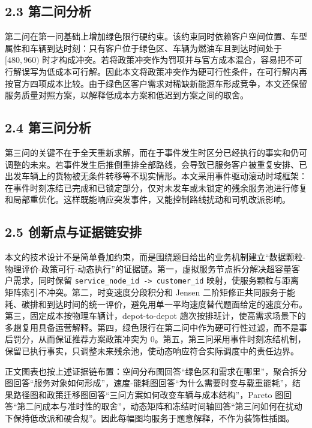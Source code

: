 \documentclass[UTF8,zihao=-4,a4paper]{ctexart}
\begin{document}
\subsection{2.3 第二问分析}

第二问在第一问基础上增加绿色限行硬约束。该约束同时依赖客户空间位置、车型属性和车辆到达时刻：只有客户位于绿色区、车辆为燃油车且到达时间处于 \([480,960)\) 时才构成冲突。若将政策冲突作为罚项并与官方成本混合，容易把不可行解误写为低成本可行解。因此本文将政策冲突作为硬可行性条件，在可行解内再按官方四项成本比较。由于绿色区客户需求对稀缺新能源车形成竞争，本文还保留服务质量对照方案，以解释低成本方案和低迟到方案之间的取舍。

\subsection{2.4 第三问分析}

第三问的关键不在于全天重新求解，而在于事件发生时区分已经执行的事实和仍可调整的未来。若事件发生后推倒重排全部路线，会导致已服务客户被重复安排、已出发车辆上的货物被无条件转移等不现实情形。本文采用事件驱动滚动时域框架：在事件时刻冻结已完成和已锁定部分，仅对未发车或未锁定的残余服务池进行修复和局部重优化。这样既能响应突发事件，又能控制路线扰动和司机改派影响。

\subsection{2.5 创新点与证据链安排}

本文的技术设计不是简单叠加约束，而是围绕题目给出的业务机制建立“数据颗粒-物理评价-政策可行-动态执行”的证据链。第一，虚拟服务节点拆分解决超容量客户需求，同时保留 \texttt{service\_node\_id -> customer\_id} 映射，使服务颗粒与距离矩阵索引不冲突。第二，时变速度分段积分和 Jensen 二阶矩修正共同服务于能耗、碳排和到达时间的统一评价，避免用单一平均速度替代题面给定的速度分布。第三，固定成本按物理车辆计，depot-to-depot 趟次按排班计，使高需求场景下的多趟复用具备运营解释。第四，绿色限行在第二问中作为硬可行性过滤，而不是事后罚分，从而保证推荐方案政策冲突为 0。第五，第三问采用事件时刻冻结机制，保留已执行事实，只调整未来残余池，使动态响应符合实际调度中的责任边界。

正文图表也按上述证据链布置：空间分布图回答“绿色区和需求在哪里”，聚合拆分图回答“服务对象如何形成”，速度-能耗图回答“为什么需要时变与载重能耗”，结果路径图和政策迁移图回答“三问方案如何改变车辆与成本结构”，Pareto 图回答“第二问成本与准时性的取舍”，动态矩阵和冻结时间轴回答“第三问如何在扰动下保持低改派和硬合规”。因此每幅图均服务于题意解释，不作为装饰性插图。
\end{document}
